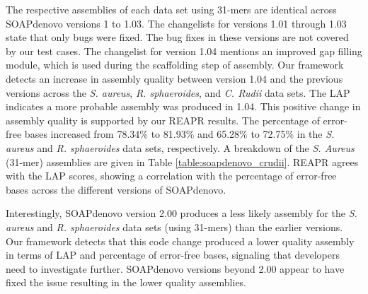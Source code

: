 The respective assemblies of each data set using 31-mers are identical across SOAPdenovo versions 1 to 1.03.
The changelists for versions 1.01 through 1.03 state that only bugs were fixed.
The bug fixes in these versions are not covered by our test cases.
The changelist for version 1.04 mentions an improved gap filling module, which is used during the scaffolding step of assembly.
Our framework detects an increase in assembly quality between version 1.04 and the previous versions across the \emph{S. aureus}, \emph{R. sphaeroides}, and \emph{C. Rudii} data sets.
The LAP indicates a more probable assembly was produced in 1.04.
This positive change in assembly quality is supported by our REAPR results.
The percentage of error-free bases increased from 78.34\% to 81.93\% and 65.28\% to 72.75\% in the \emph{S. aureus} and \emph{R. sphaeroides} data sets, respectively.
A breakdown of the \emph{S. Aureus} (31-mer) assemblies are given in Table \ref{table:soapdenovo_crudii}.
REAPR agrees with the LAP scores, showing a correlation with the percentage of error-free bases across the different versions of SOAPdenovo.

Interestingly, SOAPdenovo version 2.00 produces a less likely assembly for the \emph{S. aureus} and \emph{R. sphaeroides} data sets (using 31-mers) than the earlier versions.
Our framework detects that this code change produced a lower quality assembly in terms of LAP and percentage of error-free bases, signaling that developers need to investigate further.
SOAPdenovo versions beyond 2.00 appear to have fixed the issue resulting in the lower quality assemblies.




\renewcommand{\baselinestretch}{1}
\small\normalsize


